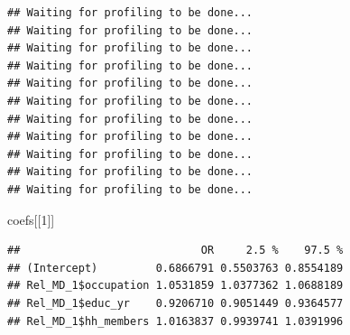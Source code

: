 \documentclass[]{book}
\newenvironment{Shaded}{\begin{snugshade}}{\end{snugshade}}
\newcommand{\ControlFlowTok}[1]{\textcolor[rgb]{0.13,0.29,0.53}{\textbf{#1}}}
\newcommand{\DataTypeTok}[1]{\textcolor[rgb]{0.13,0.29,0.53}{#1}}
\newcommand{\DecValTok}[1]{\textcolor[rgb]{0.00,0.00,0.81}{#1}}
\newcommand{\KeywordTok}[1]{\textcolor[rgb]{0.13,0.29,0.53}{\textbf{#1}}}
\newcommand{\NormalTok}[1]{#1}
\newcommand{\OperatorTok}[1]{\textcolor[rgb]{0.81,0.36,0.00}{\textbf{#1}}}
\newcommand{\StringTok}[1]{\textcolor[rgb]{0.31,0.60,0.02}{#1}}
\begin{document}
\begin{Shaded}
\end{Shaded}

\begin{verbatim}
## Waiting for profiling to be done...
## Waiting for profiling to be done...
## Waiting for profiling to be done...
## Waiting for profiling to be done...
## Waiting for profiling to be done...
## Waiting for profiling to be done...
## Waiting for profiling to be done...
## Waiting for profiling to be done...
## Waiting for profiling to be done...
## Waiting for profiling to be done...
## Waiting for profiling to be done...
\end{verbatim}

\begin{Shaded}
\begin{Highlighting}[]
\NormalTok{coefs[[}\DecValTok{1}\NormalTok{]]}
\end{Highlighting}
\end{Shaded}

\begin{verbatim}
##                            OR     2.5 %    97.5 %
## (Intercept)         0.6866791 0.5503763 0.8554189
## Rel_MD_1$occupation 1.0531859 1.0377362 1.0688189
## Rel_MD_1$educ_yr    0.9206710 0.9051449 0.9364577
## Rel_MD_1$hh_members 1.0163837 0.9939741 1.0391996
\end{verbatim}
\end{document}
